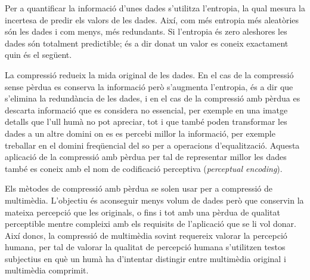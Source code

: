 Per a quantificar la informació d'unes dades s'utilitza l'entropia, la
qual mesura la incertesa de predir els valors de les dades. Així, com
més entropia més aleatòries són les dades i com menys, més
redundants. Si l'entropia és zero aleshores les dades són totalment
predictible; és a dir donat un valor es coneix exactament quin és el
següent.




La compressió redueix la mida original de les dades. En el cas de la
compressió sense pèrdua es conserva la informació però s'augmenta
l'entropia, és a dir que s'elimina la redundància de les dades, i en
el cas de la compressió amb pèrdua es descarta informació que es
considera no essencial, per exemple en una imatge detalls que l'ull
humà no pot apreciar, tot i que també poden transformar les dades a un
altre domini on es es percebi millor la informació, per exemple
treballar en el domini freqüencial del so per a operacions
d'equalització. Aquesta aplicació de la compressió amb pèrdua per tal
de representar millor les dades també es coneix amb el nom de
codificació perceptiva (\emph{perceptual encoding}).



Els mètodes de compressió amb pèrdua se solen usar per a compressió de
multimèdia. L'objectiu és aconseguir menys volum de dades però que
conservin la mateixa percepció que les originals, o fins i tot amb una
pèrdua de qualitat perceptible mentre compleixi amb els requisits de
l'aplicació que se li vol donar. Així doncs, la compressió de
multimèdia sovint requereix valorar la percepció humana, per tal de
valorar la qualitat de percepció humana s'utilitzen testos subjectius
en què un humà ha d'intentar distingir entre multimèdia original i
multimèdia comprimit.







